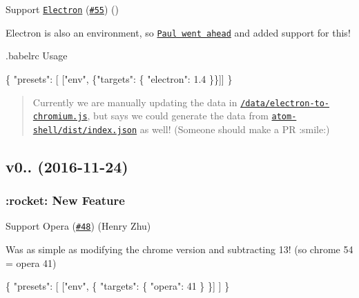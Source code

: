 \begin{DoxyItemize}
\item Support \href{http://electron.atom.io/}{\tt Electron} (\href{https://github.com/babel/babel-preset-env/pull/55}{\tt \#55}) (\href{https://github.com/paulcbetts}{\tt })
\end{DoxyItemize}

Electron is also an environment, so \href{https://twitter.com/paulcbetts/status/804507070103851008}{\tt Paul went ahead} and added support for this!

{\ttfamily .babelrc} Usage


\begin{DoxyCode}
\{
  "presets": [ ["env", \{"targets": \{ "electron": 1.4 \}\}]]
\}
\end{DoxyCode}


\begin{quote}
Currently we are manually updating the data in \href{https://github.com/babel/babel-preset-env/blob/master/data/electron-to-chromium.js}{\tt /data/electron-\/to-\/chromium.js}, but \href{https://github.com/kevinsawicki}{\tt } says we could generate the data from \href{https://gh-contractor-zcbenz.s3.amazonaws.com/atom-shell/dist/index.json}{\tt atom-\/shell/dist/index.\+json} as well! (Someone should make a PR \+:smile\+:) \end{quote}


\subsection*{v0.. (2016-\/11-\/24)}

\subsubsection*{\+:rocket\+: New Feature}


\begin{DoxyItemize}
\item Support Opera (\href{https://github.com/babel/babel-preset-env/pull/48}{\tt \#48}) (Henry Zhu)
\end{DoxyItemize}

Was as simple as modifying the chrome version and subtracting 13! (so chrome 54 = opera 41)


\begin{DoxyCode}
\{
  "presets": [
    ["env", \{
      "targets": \{
        "opera": 41
      \}
    \}]
  ]
\}
\end{DoxyCode}



